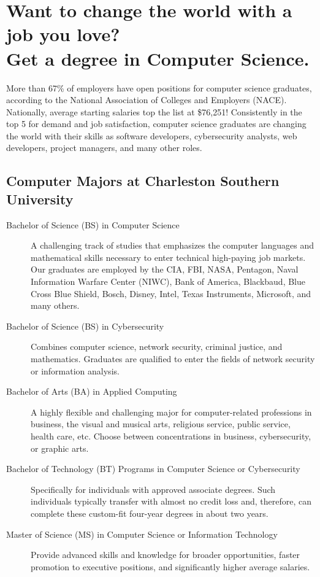 %
\section*{Want to change the world with a job you love?\\
Get a degree in Computer Science.}
More than 67\% of employers have open positions for computer science graduates, according to the National Association of Colleges and Employers (NACE). Nationally, average starting salaries top the list at \$76,251! Consistently in the top 5 for demand and job satisfaction, computer science graduates are changing the world with their skills as software developers, cybersecurity analysts, web developers, project managers, and many other roles.

\subsection{Computer Majors at Charleston Southern University}
\begin{description}
	\item[Bachelor of Science (BS) in Computer Science] A challenging track of studies that emphasizes the computer languages and mathematical skills necessary to enter technical high-paying job markets. Our graduates are employed by the CIA, FBI, NASA, Pentagon, Naval Information Warfare Center (NIWC), Bank of America, Blackbaud, Blue Cross Blue Shield, Bosch, Disney, Intel, Texas Instruments, Microsoft, and many others.

	\item[Bachelor of Science (BS) in Cybersecurity] Combines computer science, network security, criminal justice, and mathematics. Graduates are qualified to enter the fields of network security or information analysis.

	\item[Bachelor of Arts (BA) in Applied Computing] A highly flexible and challenging major for computer-related professions in business, the visual and musical arts, religious service, public service, health care, etc. Choose between concentrations in business, cybersecurity, or graphic arts.

	\item[Bachelor of Technology (BT) Programs in Computer Science or Cybersecurity] Specifically for individuals with approved associate degrees. Such individuals typically transfer with almost no credit loss and, therefore, can complete these custom-fit four-year degrees in about two years.

	\item[Master of Science (MS) in Computer Science or Information Technology] Provide advanced skills and knowledge for broader opportunities, faster promotion to executive positions, and significantly higher average salaries.%
\end{description}

